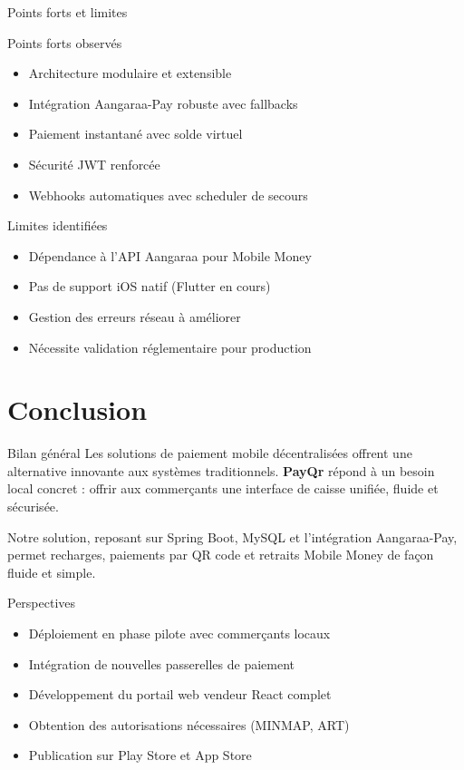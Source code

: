 \documentclass[aspectratio=169,9pt,demo]{beamer}
\begin{document}
\begin{frame}{Points forts et limites}
\begin{block}{Points forts observés}
\begin{itemize}
    \item Architecture modulaire et extensible
    \item Intégration Aangaraa-Pay robuste avec fallbacks
    \item Paiement instantané avec solde virtuel
    \item Sécurité JWT renforcée
    \item Webhooks automatiques avec scheduler de secours
\end{itemize}
\end{block}

\begin{block}{Limites identifiées}
\begin{itemize}
    \item Dépendance à l'API Aangaraa pour Mobile Money
    \item Pas de support iOS natif (Flutter en cours)
    \item Gestion des erreurs réseau à améliorer
    \item Nécessite validation réglementaire pour production
\end{itemize}
\end{block}
\end{frame}

\section{\Large Conclusion}
\begin{frame}
\begin{onehalfspace}
\begin{block}{\Large Bilan général}
Les solutions de paiement mobile décentralisées offrent une alternative innovante aux systèmes traditionnels. \textbf{PayQr} répond à un besoin local concret : offrir aux commerçants une interface de caisse unifiée, fluide et sécurisée.

\vspace{0.2cm}
Notre solution, reposant sur Spring Boot, MySQL et l'intégration Aangaraa-Pay, permet recharges, paiements par QR code et retraits Mobile Money de façon fluide et simple.
\end{block}

\begin{block}{\Large Perspectives}
\begin{itemize}
    \item Déploiement en phase pilote avec commerçants locaux
    \item Intégration de nouvelles passerelles de paiement
    \item Développement du portail web vendeur React complet
    \item Obtention des autorisations nécessaires (MINMAP, ART)
    \item Publication sur Play Store et App Store
\end{itemize}
\end{block}
\end{onehalfspace}
\end{frame}
\end{document}
